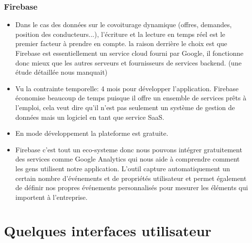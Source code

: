 \subsubsection{Firebase} %
\label{ssub:firebase}
\begin{itemize}
	\item Dans le cas des données sur le covoiturage dynamique (offres, demandes, position des conducteurs...), l’écriture et la lecture en temps réel est le premier facteur à prendre en compte. la raison derrière le choix est que Firebase est essentiellement un service cloud fourni par Google, il fonctionne donc mieux que les autres serveurs et fournisseurs de services backend. (une étude détaillée nous manquait)
	\item Vu la contrainte temporelle: 4 mois pour développer l'application. Firebase économise beaucoup de temps puisque il offre un ensemble de services prêts à l'emploi, cela veut dire qu'il n'est pas seulement un système de gestion de données mais un logiciel en tant que service SaaS.
	\item En mode développement la plateforme est gratuite.
	\item Firebase c'est tout un eco-systeme donc nous pouvons intégrer gratuitement des services comme Google Analytics qui nous aide à comprendre comment les gens utilisent notre application. L'outil capture automatiquement un certain nombre d'événements et de propriétés utilisateur et permet également de définir nos propres événements personnalisés pour mesurer les éléments qui importent à l'entreprise. 
\end{itemize}

\section{Quelques interfaces utilisateur}

